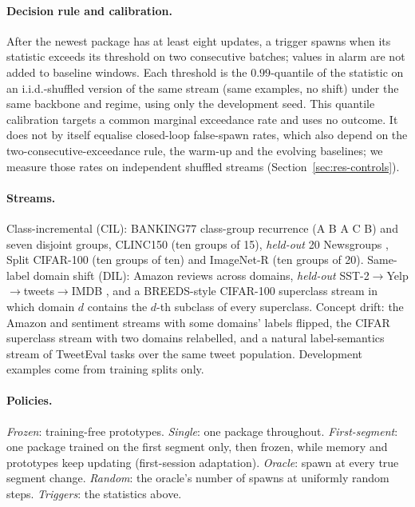 \documentclass[10pt]{article}
\begin{document}
\paragraph{Decision rule and calibration.} After the newest package has at least eight updates, a trigger spawns when its statistic exceeds its threshold on two consecutive batches; values in alarm are not added to baseline windows. Each threshold is the $0.99$-quantile of the statistic on an i.i.d.-shuffled version of the same stream (same examples, no shift) under the same backbone and regime, using only the development seed. This quantile calibration targets a common marginal exceedance rate and uses no outcome. It does not by itself equalise closed-loop false-spawn rates, which also depend on the two-consecutive-exceedance rule, the warm-up and the evolving baselines; we measure those rates on independent shuffled streams (Section~\ref{sec:res-controls}).

\paragraph{Streams.} Class-incremental (CIL): BANKING77 \citep{casanueva2020banking} class-group recurrence (A B A C B) and seven disjoint groups, CLINC150 \citep{larson2019clinc} (ten groups of 15), \emph{held-out} 20 Newsgroups \citep{lang1995newsweeder}, Split CIFAR-100 \citep{krizhevsky2009cifar} (ten groups of ten) and ImageNet-R \citep{hendrycks2021imagenetr} (ten groups of 20). Same-label domain shift (DIL): Amazon reviews \citep{keung2020marc} across domains, \emph{held-out} SST-2$\to$Yelp$\to$tweets$\to$IMDB \citep{socher2013sst,zhang2015charcnn,barbieri2020tweeteval,maas2011imdb}, and a BREEDS-style \citep{santurkar2021breeds} CIFAR-100 superclass stream in which domain $d$ contains the $d$-th subclass of every superclass. Concept drift: the Amazon and sentiment streams with some domains' labels flipped, the CIFAR superclass stream with two domains relabelled, and a natural label-semantics stream of TweetEval tasks over the same tweet population. Development examples come from training splits only.

\paragraph{Policies.} \emph{Frozen}: training-free prototypes. \emph{Single}: one package throughout. \emph{First-segment}: one package trained on the first segment only, then frozen, while memory and prototypes keep updating (first-session adaptation). \emph{Oracle}: spawn at every true segment change. \emph{Random}: the oracle's number of spawns at uniformly random steps. \emph{Triggers}: the statistics above.
\end{document}
